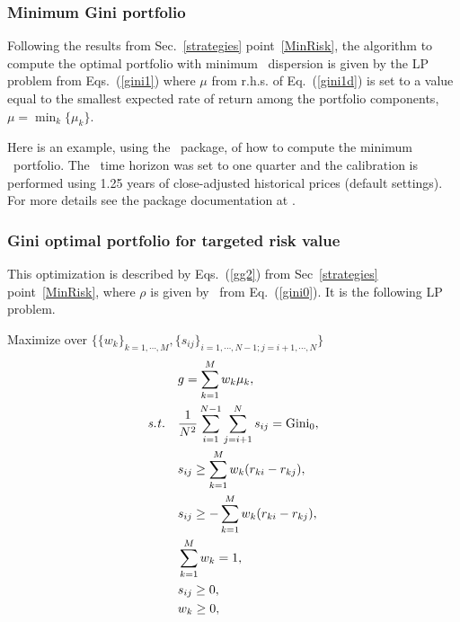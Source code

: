 

\BackToContents


\subsubsection{Minimum Gini portfolio}

Following the results from Sec.~\ref{strategies} point~\ref{MinRisk},
the algorithm to compute the optimal portfolio with minimum \GINI\ dispersion is given by the LP problem from Eqs.~(\ref{gini1}) where
$\mu$ from r.h.s. of Eq.~(\ref{gini1d}) is set to a value equal to the smallest expected rate of
return among the portfolio components, \ie\ $\mu=\min_k\{\mu_k\}$.

\bigskip
\noindent Here is an example, using the \azapy\ package, of how to compute the minimum \GINI\ portfolio.
The \GINI\ time horizon was set to one quarter and the calibration is performed using 1.25 years of
close-adjusted historical prices (default settings).
For more details see the package documentation at \azapydoc.



\BackToContents


\subsubsection{Gini optimal portfolio for targeted risk value}
This optimization is described by  Eqs.~(\ref{gg2}) from Sec~\ref{strategies} point~\ref{MinRisk},
where $\rho$ is given by \GINI\ from Eq.~(\ref{gini0}).
It is the following LP problem.

\bigskip
\noindent Maximize over $\{ \{w_k\}_{k=1,\cdots,M}, \{s_{ij}\}_{i=1,\cdots,N-1; j = i+1,\cdots,N} \}$
\begin{subequations}\label{gini3}
\begin{align}
    &g = \sum_{k=1}^M w_k \mu_k , \label{gini3a} \\
    \st & \frac{1}{N^2} \sum_{i=1}^{N-1} \sum_{j = i+1}^N s_{ij} = \GINI_0, \label{gini3d} \\
        & s_{ij} \geq \sum_{k=1}^M w_k (r_{ki} - r_{kj}), \label{gini3b} \\
        & s_{ij} \geq -\sum_{k=1}^M w_k (r_{ki} - r_{kj}), \label{gin3c} \\
        & \sum_{k=1}^M w_k = 1, \label{gini3e} \\
        & s_{ij} \geq 0, \label{gini3g} \\
        & w_k \geq 0, \label{gin3f}
\end{align}
\end{subequations}

